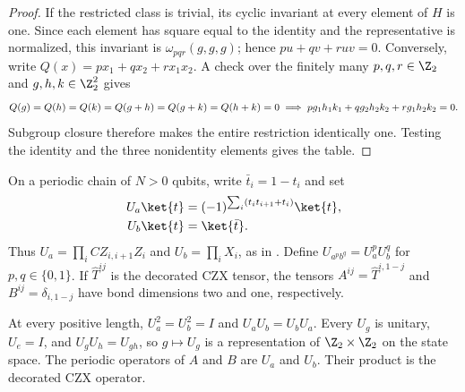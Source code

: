 \begin{proof}
    \leanok
    If the restricted class is trivial, its cyclic invariant at every
    element of $H$ is one. Since each element has square equal to the
    identity and the representative is normalized, this invariant is
    $\omega_{pqr}(g,g,g)$; hence $pu+qv+ruv=0$.
    Conversely, write $Q(x)=px_1+qx_2+rx_1x_2$. A check over the finitely
    many $p,q,r\in\Z_2$ and $g,h,k\in\Z_2^2$ gives
    \begin{align}
        Q(g)=Q(h)=Q(k)=Q(g+h)=Q(g+k)=Q(h+k)=0
        \implies pg_1h_1k_1+qg_2h_2k_2+rg_1h_2k_2=0.
        \notag
    \end{align}
    Subgroup closure therefore makes
    the entire restriction identically one.
    Testing the identity and the three nonidentity elements gives the table.
\end{proof}

\begin{definition}
    \label{def:asymex_klein_spin_symmetry}
    \leanok
    On a periodic chain of $N>0$ qubits, write $\bar t_i=1-t_i$ and set
    \begin{align}
        \label{eq:asymex_klein_spin_generators}
        U_a\ket{t} & =(-1)^{\sum_i(t_it_{i+1}+t_i)}\ket{t}, \\
        U_b\ket{t} & =\ket{\bar t}.\notag
    \end{align}
    Thus $U_a=\prod_i CZ_{i,i+1}Z_i$ and $U_b=\prod_i X_i$, as in
    \cite[Section~6]{GarreRubio2023MPOSym}. Define
    $U_{a^p b^q}=U_a^pU_b^q$ for $p,q\in\{0,1\}$.
    If $\widehat T^{ij}$ is the decorated CZX tensor, the tensors
    $A^{ij}=\widehat T^{i,1-j}$ and $B^{ij}=\delta_{i,1-j}$ have bond dimensions
    two and one, respectively.
\end{definition}

\begin{lemma}
    \label{thm:asymex_klein_spin_representation}
    \leanok
    At every positive length, $U_a^2=U_b^2=I$ and $U_aU_b=U_bU_a$.
    Every $U_g$ is unitary, $U_e=I$, and $U_gU_h=U_{gh}$, so $g\mapsto U_g$
    is a representation of $\Z_2\times\Z_2$ on the state space.
    The periodic operators of $A$ and $B$ are $U_a$ and $U_b$.
    Their product is the decorated CZX operator.
\end{lemma}

